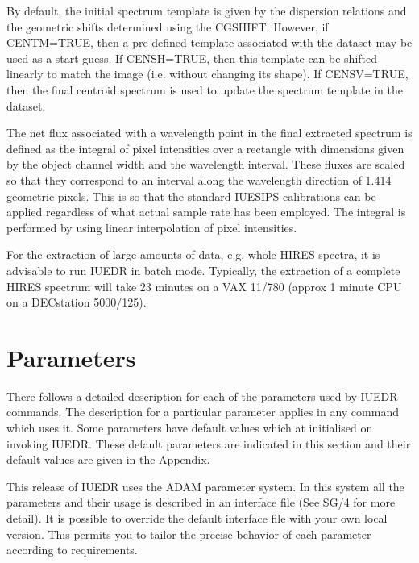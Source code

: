 \begin {description}
\begin {description}
By default, the initial spectrum template is given by the dispersion
relations and the geometric shifts determined using the CGSHIFT.
However, if CENTM=TRUE, then a pre-defined template associated with
the dataset may be used as a start guess.
If CENSH=TRUE, then this template can be shifted linearly to match the
image (i.e. without changing its shape).
If CENSV=TRUE, then the final centroid spectrum is used to update the
spectrum template in the dataset.

The net flux associated with a wavelength point in the final extracted
spectrum is defined as the integral of pixel intensities over a rectangle
with dimensions given by the object channel width and the wavelength
interval.
These fluxes are scaled so that they correspond to an interval
along the wavelength direction of 1.414 geometric pixels.
This is so that the standard IUESIPS calibrations can be applied
regardless of what actual sample rate has been employed.
The integral is performed by using linear interpolation of pixel intensities.

For the extraction of large amounts of data, e.g. whole HIRES spectra,
it is advisable to run IUEDR in batch mode. Typically, the extraction
of a complete HIRES spectrum will take 23 minutes on a VAX 11/780 (approx
1 minute CPU on a DECstation 5000/125).
\end {description}
\end {description}
\newpage

\section {Parameters}

There follows a detailed description for each of the parameters used by
IUEDR commands. 
The description for a particular parameter applies in any
command which uses it. 
Some parameters have default values which at initialised on invoking
IUEDR.
These default parameters are indicated in this section and their
default values are given in the Appendix. 

This release of IUEDR uses the ADAM parameter system. In this system
all the parameters and their usage is described in an interface file 
(See SG/4 for more detail). It is possible to override the default
interface file with your own local version. This permits you to tailor
the precise behavior of each parameter according to requirements.



